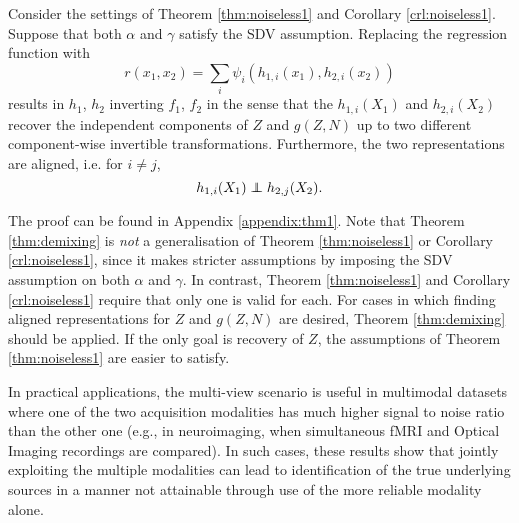 \begin{theorem}\label{thm:demixing}
	Consider the settings of Theorem \ref{thm:noiseless1} and Corollary \ref{crl:noiseless1}.
	Suppose that both ${\alpha}$ and ${\gamma}$ satisfy the SDV assumption.
	Replacing the regression function with
	\begin{equation}\label{eqn:double-regression-fn}
	r({x}_{1},{x}_{2})=\sum_{i}\psi_{i}(h_{1,i}({x}_{1}),h_{2,i}({x}_{2}))
	\end{equation}
	results in ${h}_1$, ${h}_2$ inverting ${f}_1$, ${f}_2$ in the sense that the $h_{1,i}({X}_1)$ and $h_{2,i}({X}_2)$ recover the independent components of ${Z}$ and ${g}({Z}, {N})$ up to two different component-wise invertible transformations. Furthermore, the two representations are aligned, i.e. for $i\not=j$,
	\begin{equation*}
	h_{1,i}({X}_{1})\independent h_{2,j}({X}_{2}).
	\end{equation*}
\end{theorem}
The proof can be found in Appendix \ref{appendix:thm1}.
Note that Theorem \ref{thm:demixing} is \emph{not} a generalisation of Theorem \ref{thm:noiseless1} or Corollary \ref{crl:noiseless1}, since it makes stricter assumptions by imposing the SDV assumption on both ${\alpha}$ and ${\gamma}$.
In contrast, Theorem \ref{thm:noiseless1} and Corollary \ref{crl:noiseless1} require that only one is valid for each.
For cases in which finding aligned representations for ${Z}$ and ${g}({Z}, {N})$ are desired, Theorem \ref{thm:demixing} should be applied.
If the only goal is recovery of ${Z}$, the assumptions of Theorem \ref{thm:noiseless1} are easier to satisfy.


In practical applications, the multi-view scenario is useful in multimodal datasets where one of the two acquisition modalities has much higher signal to noise ratio than the other one (e.g., in neuroimaging, when simultaneous fMRI and Optical Imaging recordings are compared). In such cases,
these results show that jointly exploiting the multiple modalities can lead to identification of the true underlying sources in a manner not attainable through use of the more reliable modality alone.



